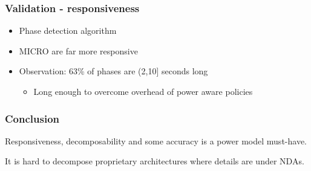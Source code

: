 \documentclass[screen]{beamer}
\begin{document}
\begin{frame}
    \frametitle{Validation - responsiveness}

    \begin{itemize}
        \item Phase detection algorithm
        \item {\ttfamily MICRO} are far more responsive

    \item Observation: 63\% of phases are (2,10] seconds long
        \begin{itemize}
            \item Long enough to overcome overhead of power aware policies
        \end{itemize}

    \end{itemize}

\end{frame}

\begin{frame}

    \frametitle{Conclusion}

   Responsiveness, decomposability and some accuracy is a power model must-have.

   It is hard to decompose proprietary architectures where details are under NDAs.

\end{frame}




\end{document}
